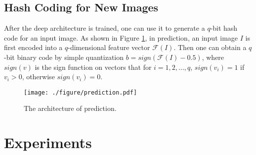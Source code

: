 \documentclass[10pt,twocolumn,letterpaper]{article}
\begin{document}
\subsection{Hash Coding for New Images\label{pred}}
After the deep architecture is trained, one can use it to generate a $q$-bit hash code for an input image. As shown in Figure \ref{prediction}, in prediction, an input image $I$ is first encoded into a $q$-dimensional feature vector $\mathcal{F}(I)$. Then one can obtain a $q$-bit binary code by simple quantization $b=sign(\mathcal{F}(I) - 0.5)$, where $sign(v)$ is the sign function on vectors that for $i=1,2,...,q$, $sign(v_i)=1$ if $v_i>0$, otherwise $sign(v_i)=0$.

\begin{figure}[h]
  \centering
  \texttt{[image: ./figure/prediction.pdf]}
  \caption{The architecture of prediction.}
    \label{prediction}
\end{figure}


\section{Experiments}
\end{document}
